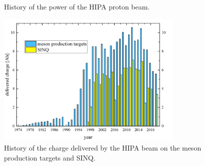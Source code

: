\begin{refsection}
\begin{figure}
            \caption{History of the power of the HIPA proton beam.}
            \label{fig:PSI:HIPA:power}
        \end{figure}
        \begin{figure}
            \centering
            \includegraphics[width = 0.8\textwidth]{Figures/Introduction/PSI_HIPA_charge.png}
            \caption{History of the charge delivered by the HIPA beam on the meson production targets and SINQ.}
            \label{fig:PSI:HIPA:charge}
        \end{figure}
   

\end{refsection}
